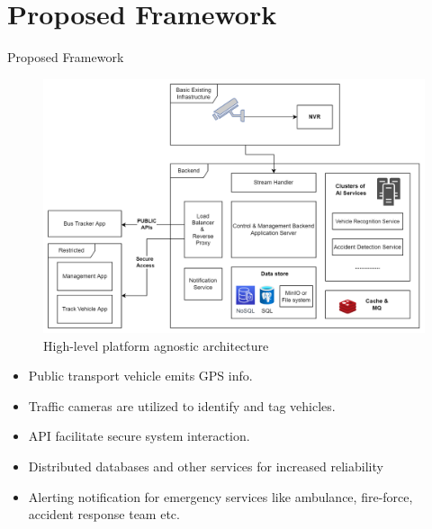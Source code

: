 \documentclass{beamer}
\begin{document}
	
	\section{Proposed Framework}
	\begin{frame}{Proposed Framework}
		\begin{figure}
			\includegraphics[width=0.8\linewidth]{res/architecture.png}
			\caption{High-level platform agnostic architecture}
		\end{figure}
	\end{frame}
	
	\begin{frame}
		\begin{itemize}
			\item Public transport vehicle emits GPS info.
			\item Traffic cameras are utilized to identify and tag vehicles.
			\item API facilitate secure system interaction.
			\item Distributed databases and other services for increased reliability
			\item Alerting notification for emergency services like ambulance, fire-force, accident response team etc.
		\end{itemize}
	\end{frame}
	
\end{document}
